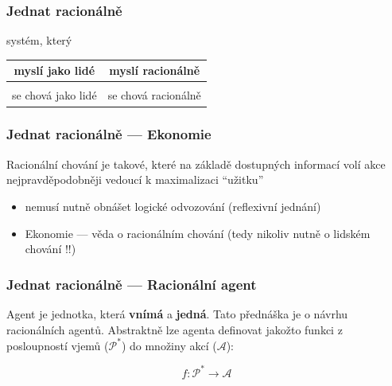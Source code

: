\documentclass[red,handout,professionalfont]{beamer}
\theoremstyle{definition}
\newcommand{\0}{\mbox{${\bf 0}$}}
\renewcommand{\emph}[1]{{\bf #1}}
\begin{document}
\begin{frame}\frametitle{Jednat racionálně}
\large
\begin{center}
systém, který\\[1cm]
\begin{tabular}{c|c}
 myslí jako lidé & myslí racionálně \\[0.5cm]
 \hline
\\
 se chová jako lidé & \alert{se chová racionálně}      \\
\end{tabular}
\end{center}
\end{frame}

\begin{frame}\frametitle{Jednat racionálně --- Ekonomie}
\begin{block}{}
Racionální chování je takové, které na základě dostupných informací volí akce nejpravděpodobněji vedoucí k maximalizaci ``užitku''
\end{block}\pause{}
\begin{itemize}
 \item nemusí nutně obnášet logické odvozování (reflexivní jednání)\pause{}
 \item Ekonomie --- věda o racionálním chování\pause{} (tedy nikoliv nutně o lidském chování !!)
\end{itemize}
\end{frame}

\begin{frame}\frametitle{Jednat racionálně --- Racionální agent}
\alert{Agent} je jednotka, která \emph{vnímá}\pause{} a \emph{jedná}.\pause{}
Tato přednáška je o návrhu racionálních agentů.\pause{} 
Abstraktně lze agenta definovat jakožto funkci z posloupností vjemů ($\mathcal P^*$) do množiny akcí ($\mathcal A$):
\begin{block}{}
\begin{displaymath}
 f: {\mathcal P}^* \to {\mathcal A}
\end{displaymath}
\end{block}
\end{frame}
\end{document}
